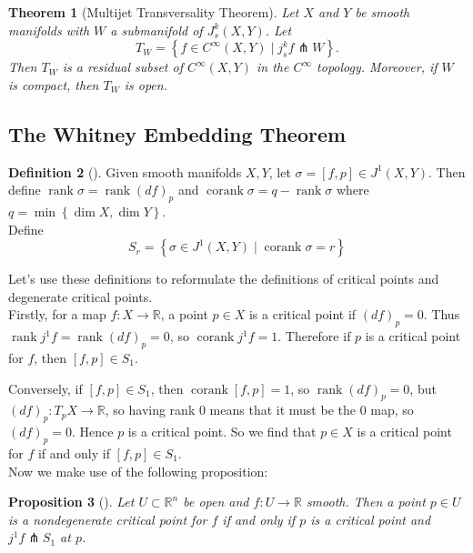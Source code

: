 \documentclass[reqno]{amsart}
\newtheorem{theorem}{Theorem}[section]
\newtheorem{proposition}[theorem]{Proposition}
\theoremstyle{definition}
\newtheorem{definition}[theorem]{Definition}
\theoremstyle{remark}
\DeclareMathOperator{\corank}{corank}
\DeclareMathOperator{\rank}{rank}
\begin{document}
\begin{theorem}[Multijet Transversality Theorem]\label{Multijet-Transversality}
    Let $X$ and $Y$ be smooth manifolds with
    $W$ a submanifold of $J_s^{k}(X,Y)$. Let
    \[
    T_W = 
    \left\{ f \in C^{\infty}(X,Y) \mid 
    j_s^{k}f \pitchfork W \right\} .
    \] 
    Then
    $T_W$ is a residual subset of
    $C^{\infty}(X,Y)$ in the
    $C^{\infty}$ topology.
    Moreover, if $W$ is compact, then
    $T_W$ is open.
\end{theorem}

\subsection{The Whitney Embedding Theorem}

\begin{definition}[]
    Given smooth manifolds $X,Y$, let
    $\sigma = \left[ f,p \right] 
    \in J^{1}(X,Y)$. Then define
    $\rank \sigma = \rank \left( df \right)_p$ and
    $\corank \sigma = q - \rank \sigma$ where
    $q = \min \left\{ \dim X, \dim Y \right\} $.\\
    Define
    \[
    S_r = \left\{ \sigma \in J^{1}(X,Y)  \mid 
    \corank \sigma = r \right\} 
    \] 
\end{definition}

Let's use these definitions to
reformulate the definitions of critical points and
degenerate critical points.\\

Firstly, for a map $f \colon X \to \mathbb{R}$, a
point $p \in X$ is a critical point if
$(df)_p = 0$. Thus
$\rank j^{1} f = \rank (df)_p = 0$, so
$\corank j^{1}f = 1$. Therefore
 if $p$ is a critical point for  $f$, then
 $\left[ f,p \right] \in S_1$.

 Conversely, if
 $\left[ f,p \right] \in S_1$, then
 $\corank \left[ f,p \right] = 1$, so
 $\rank \left( df \right)_p = 0$, but
 $\left( df \right)_p \colon T_p X \to \mathbb{R}$, so
 having rank $0$ means that it must be the $0$ map, so
 $(df)_p = 0$. Hence $p$ is a critical point. So we find that
 $p \in X$ is a critical point for $f$ if and only if
 $\left[ f,p \right] \in S_1$.\\
 \linebreak
 Now we make use of the following proposition:
 \begin{proposition}[]\label{Nondegenerate-Equiv-Jets}
     Let $U \subset \mathbb{R}^{n}$ be open
     and $f \colon U \to \mathbb{R}$ smooth. Then
     a point $p \in U$ is a nondegenerate critical point
     for $f$ if and only if 
     $p$ is a critical point and
     $j^{1}f \pitchfork S_1$ at $p$.
 \end{proposition}
\end{document}
